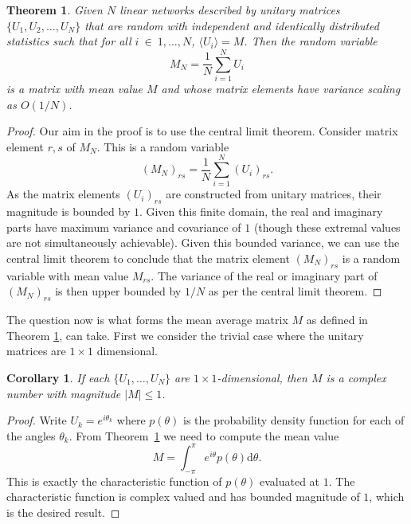 \documentclass[aps,pra,twocolumn,superscriptaddress,numerical,floatfix]{revtex4-1}
\newtheorem{theorem}{Theorem}
\newtheorem{corollary}{Corollary}
\begin{document}
\begin{theorem}
\label{Theorem 1}
Given $N$ linear networks described by unitary matrices $\{U_1,U_2,\ldots,U_N\}$ that are random with independent and identically distributed statistics such that for all $i~\in~{1,\ldots,N}$, $\langle U_i \rangle = M$.  Then the random variable 
\begin{equation}
	\label{sum_unitary}
	M_{N}=\frac{1}{N}\sum_{i=1}^{N}U_{i}
\end{equation}
is a matrix with mean value $M$ and whose matrix elements have variance scaling as $O(1/N)$.
\end{theorem}

\begin{proof}\label{Proof 1}
Our aim in the proof is to use the central limit theorem.  Consider matrix element $r,s$ of $M_N$.  This is a random variable
\begin{equation}
	\left(M_N\right)_{rs} = \frac{1}{N} \sum_{i=1}^N \left(U_i\right)_{rs}.
\end{equation}
As the matrix elements $(U_i)_{rs}$ are constructed from unitary matrices, their magnitude is bounded by $1$.  Given this finite domain, the real and imaginary parts have maximum variance and covariance of $1$ (though these extremal values are not simultaneously achievable).  Given this bounded variance, we can use the central limit theorem to conclude that the matrix element $\left(M_N\right)_{rs}$ is a random variable with mean value $M_{rs}$.
The variance of the real or imaginary part of $(M_N)_{rs}$ is then upper bounded by $1/N$ as per the central limit theorem.
\end{proof}

The question now is what forms the mean average matrix $M$ as defined in Theorem \ref{Theorem 1}, can take. First we consider the trivial case where the unitary matrices are $1 \times 1$ dimensional.

\begin{corollary}
\label{Corollary 1}
	If each $\{U_1,\ldots,U_N\}$ are $1 \times 1$-dimensional, then $M$ is a complex number with magnitude $|M| \leq 1$.
\end{corollary}
\begin{proof}
	Write $U_k = e^{i \theta_k}$ where $p(\theta)$ is the probability density function for each of the angles $\theta_k$. From Theorem~\ref{Theorem 1} we need to compute the mean value 
	\begin{equation}
		M = \int^\pi_{-\pi} e^{i\theta} p(\theta) \mathrm{d}\theta. \label{eq:single parameter, single mode}
	\end{equation}
This is exactly the characteristic function of $p(\theta)$ evaluated at $1$.  The characteristic function is complex valued and has bounded magnitude of $1$, which is the desired result.
\end{proof}
\end{document}
